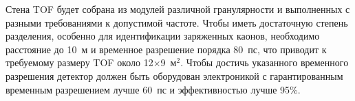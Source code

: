 
Стена TOF будет собрана из модулей различной гранулярности и выполненных с разными требованиями к допустимой частоте. Чтобы иметь достаточную степень разделения, особенно для идентификации заряженных каонов, необходимо расстояние до 10~м и временное разрешение порядка 80~пс, что приводит к требуемому размеру TOF около 12$\times$9~м$^2$. Чтобы достичь указанного временного разрешения детектор должен быть оборудован электроникой с гарантированным временным разрешением лучше 60~пс и эффективностью лучше 95\%.


